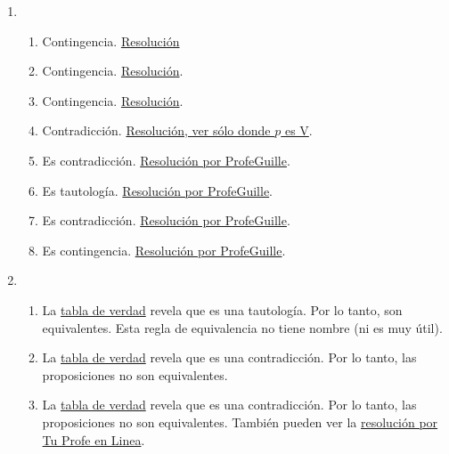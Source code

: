 \documentclass[a4paper]{article}
\newcommand{\exercise}{\item}
\newcommand{\then}{\to}
\newcommand{\eq}{\leftrightarrow}
\begin{document}
\begin{enumerate}
\begin{enumerate} [label=(\alph*)]
		\item $( p  \land  q )  \land  r  \land  s $. $p$:"\textit{En un juego son importantes las mecánicas}", $q$:"\textit{En un juego es importantes la historia}", $r$:"\textit{Las mecánicas mantienen a la persona jugadora activa}" y $s$:"\textit{La historia la mantiene interesada}".
		\item $( q \then  p ) \eq  ( p \lor  \neg q)$ con $p$:"\textit{Los fantasmas se ponen azules}" y $q$:"\textit{El pacman come la fruta}".
\end{enumerate}\exercise\begin{enumerate} [label=(\alph*)]		\item Contingencia. \href{https://www.wolframalpha.com/input?i=p+or++%28not+q+xor++r%29}{Resolución}
		\item Contingencia. \href{https://www.wolframalpha.com/input?i=p+and++q+or++r}{Resolución}.
		\item Contingencia. \href{https://www.wolframalpha.com/input?i=not+%28p+%3D%3E+%28q+and++r%29%29}{Resolución}.
		\item Contradicción. \href{https://www.wolframalpha.com/input?i=not+%28%28p+nor+q%29+%3D%3E+r%29}{Resolución, ver sólo donde $p$ es V}.
		\item Es contradicción. \href{https://youtu.be/n_t1f0xa3D0?t=413}{Resolución por ProfeGuille}.
		\item Es tautología. \href{https://youtu.be/n_t1f0xa3D0?t=643}{Resolución por ProfeGuille}.
		\item Es contradicción. \href{https://youtu.be/rlJmcBGdOoY}{Resolución por ProfeGuille}.
		\item Es contingencia. \href{https://youtu.be/n_t1f0xa3D0?t=40}{Resolución por ProfeGuille}.
\end{enumerate}\exercise\begin{enumerate} [label=(\alph*)]		\item La \href{https://www.wolframalpha.com/input?i=truth+table%3A%28not+p+%3D%3E+p%29+%3C%3D%3E+p}{tabla de verdad} revela que es una tautología. Por lo tanto, son equivalentes. Esta regla de equivalencia no tiene nombre (ni es muy útil). 
		\item La \href{https://www.wolframalpha.com/input?i=%28not+p+or+not+q%29+%3C%3D%3E+%28p+and+q%29}{tabla de verdad} revela que es una contradicción. Por lo tanto, las proposiciones no son equivalentes.
		\item La \href{https://www.wolframalpha.com/input?i=%28p+and+not+q%29+%3C%3D%3E+%28not+p+or+q%29}{tabla de verdad} revela que es una contradicción. Por lo tanto, las proposiciones no son equivalentes. También pueden ver la \href{https://youtu.be/NZSuHeymu4M?t=639}{resolución por Tu Profe en Linea}.

\end{enumerate}
\end{enumerate}
\end{document}
